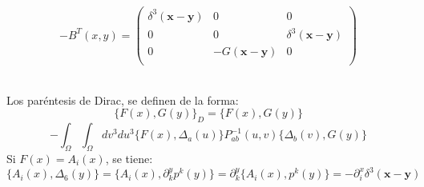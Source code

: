 \documentclass[a4paper,12pt]{article}
\begin{document}
$$-B^T(x,y)=\left(\begin{matrix}
\delta^3(\textbf{x}-\textbf{y}) & 0 & 0 \\
 0 & 0 & \delta^3(\textbf{x}-\textbf{y})\\
 0 & -G(\textbf{x}-\textbf{y}) & 0  \\
\end{matrix}\right)$$
\vspace{0,4cm}

\\

Los paréntesis de Dirac, se definen de la forma:
\begin{equation}
\{F(x),G(y)\}_D=\{F(x),G(y)\}
\end{equation}
$$-\int_{\Omega}\int_\Omega dv^3du^3\{F(x),\Delta_a(u)\}P_{ab}^{-1}(u,v)\{\Delta_b(v),G(y)\}$$
Si $F(x)=A_i(x)$, se tiene:
\begin{equation}
\{A_i(x),\Delta_6(y)\}=\{A_i(x),\partial_k^yp^{k}(y)\}=\partial_k^y\{A_i(x),p^{k}(y)\}=-\partial_i^x\delta^3(\textbf{x}-\textbf{y})
\end{equation}
\end{document}
